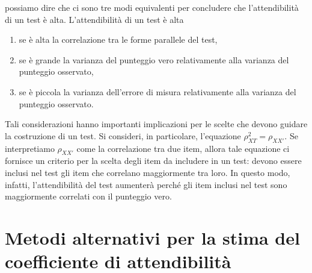 \documentclass[
  11pt,
]{krantz}
\providecommand{\tightlist}{%
  \setlength{\itemsep}{0pt}\setlength{\parskip}{0pt}}
\theoremstyle{definition}
\theoremstyle{definition}
\theoremstyle{definition}
\theoremstyle{definition}
\theoremstyle{remark}
\begin{document}
possiamo dire che ci sono tre modi equivalenti per concludere che l'attendibilità di un test è alta. L'attendibilità di un test è alta

\begin{enumerate}
\def\labelenumi{\arabic{enumi}.}
\tightlist
\item
  se è alta la correlazione tra le forme parallele del test,
\item
  se è grande la varianza del punteggio vero relativamente alla varianza del punteggio osservato,
\item
  se è piccola la varianza dell'errore di misura relativamente alla varianza del punteggio osservato.
\end{enumerate}

Tali considerazioni hanno importanti implicazioni per le scelte che devono guidare la costruzione di un test. Si consideri, in particolare, l'equazione \(\rho^2_{XT} = \rho_{XX'}\). Se interpretiamo \(\rho_{XX'}\) come la correlazione tra due item, allora tale equazione ci fornisce un criterio per la scelta degli item da includere in un test: devono essere inclusi nel test gli item che correlano maggiormente tra loro. In questo modo, infatti, l'attendibilità del test aumenterà perché gli item inclusi nel test sono maggiormente correlati con il punteggio vero.

\hypertarget{metodi-alternativi-per-la-stima-del-coefficiente-di-attendibilituxe0}{%
\section{Metodi alternativi per la stima del coefficiente di attendibilità}\label{metodi-alternativi-per-la-stima-del-coefficiente-di-attendibilituxe0}}
\end{document}
